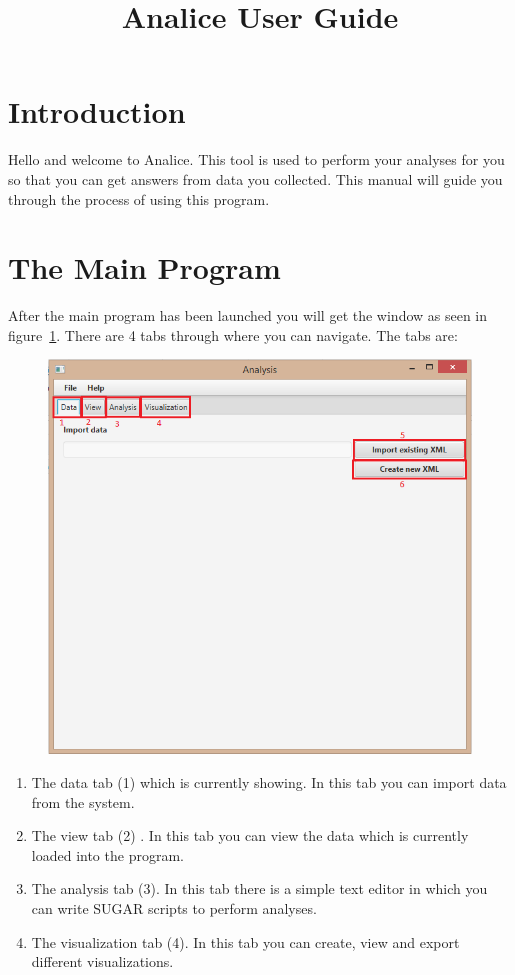 \documentclass[a4paper]{article}
\title{Analice User Guide}
\begin{document}
\maketitle
\tableofcontents

\newpage

\section{Introduction}
Hello and welcome to Analice. This tool is used to perform your analyses for you so that you can get answers from data you collected. This manual will guide you through the process of using this program.

\section{The Main Program}
After the main program has been launched you will get the window as seen in figure~\ref{fig:main}. There are 4 tabs through where you can navigate. The tabs are:

\begin{figure}[h]
	\centering
	\includegraphics[scale=0.6]{mainprogram.png}
	\caption{}
	\label{fig:main}
\end{figure}

\begin{enumerate}
\item The data tab (1) which is currently showing. In this tab you can import data from the system. 
\item The view tab (2) . In this tab you can view the data which is currently loaded into the program.
\item The analysis tab (3). In this tab there is a simple text editor in which you can write SUGAR scripts to perform analyses.
\item The visualization tab (4). In this tab you can create, view and export different visualizations.
\end{enumerate}
\end{document}
